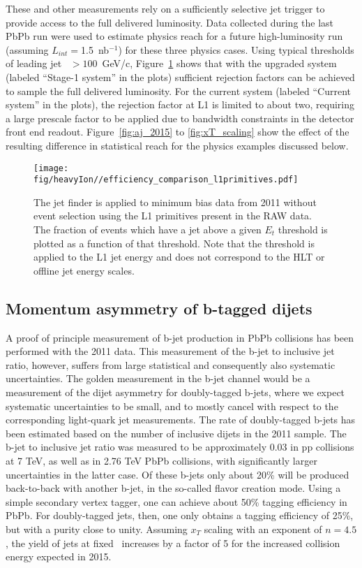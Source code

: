 These and other measurements rely on a sufficiently selective jet trigger to provide access to the 
full delivered luminosity.  Data collected during the last PbPb run were used to estimate physics reach  
for a future high-luminosity run (assuming $L_{int} =$1.5~nb$^{-1}$) for these three physics cases. Using
typical thresholds of leading jet \pt\ $>100$~GeV/c, Figure~\ref{fig:efficiency_comparison} shows that 
with the upgraded system (labeled ``Stage-1 system'' in the plots) sufficient rejection factors can be 
achieved to sample the full delivered luminosity. For the current system (labeled ``Current system'' in the 
plots), the rejection factor at L1 is limited to about two, requiring a large prescale factor to be applied
due to bandwidth constraints in the detector front end readout. Figure~\ref{fig:aj_2015} to 
\ref{fig:xT_scaling} show the effect of the resulting difference in statistical reach 
for the physics examples discussed below.

\begin{figure}[!ht]
\begin{center}
\texttt{[image: fig/heavyIon//efficiency\_comparison\_l1primitives.pdf]}
\caption{The jet finder is applied to minimum bias data from 2011 without
event selection using the L1 primitives present in the RAW data. The
fraction of events which have a jet above a given $E_t$ threshold is plotted
as a function of that threshold. Note that the threshold is applied to the
L1 jet energy and does not correspond to the HLT or offline jet energy
scales.}
\label{fig:efficiency_comparison}
\end{center}
\end{figure}


\subsection{Momentum asymmetry of b-tagged dijets}

A proof of principle measurement of b-jet production in PbPb collisions has
been performed with the 2011 data.  
This measurement of the b-jet to inclusive jet ratio, however, suffers from
large statistical and consequently also systematic uncertainties.  
The golden measurement in the b-jet channel would be a measurement of the
dijet asymmetry for doubly-tagged b-jets, 
where we expect systematic uncertainties to be small, and to mostly cancel
with respect to the corresponding light-quark jet measurements.  
The rate of doubly-tagged b-jets has been estimated based on the number
of inclusive dijets in the 2011 sample.  
The b-jet to inclusive jet ratio was measured to be approximately 0.03 in pp
collisions at 7 TeV, as well as in 2.76 TeV PbPb collisions, with 
significantly larger uncertainties in the latter case.  Of these b-jets only
about 20\% will be produced back-to-back with another b-jet, 
in the so-called flavor creation mode.  Using a simple secondary vertex
tagger, one can achieve about 50\% tagging efficiency in PbPb.  
For doubly-tagged jets, then, one only obtains a tagging efficiency of 25\%,
but with a purity close to unity.  
Assuming $x_{T}$ scaling with an exponent of $n = 4.5$, the yield of jets at
fixed \pt\ increases by a factor of 5 for the increased collision energy 
expected in 2015.  

